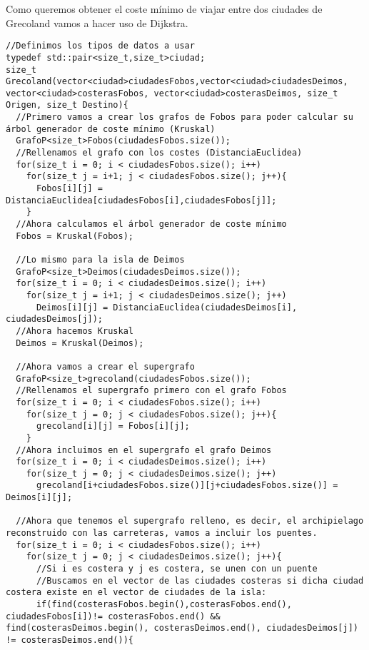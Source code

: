 Como queremos obtener el coste mínimo de viajar entre dos ciudades de Grecoland vamos a hacer uso de Dijkstra.
\begin{verbatim}
//Definimos los tipos de datos a usar
typedef std::pair<size_t,size_t>ciudad;
size_t Grecoland(vector<ciudad>ciudadesFobos,vector<ciudad>ciudadesDeimos, vector<ciudad>costerasFobos, vector<ciudad>costerasDeimos, size_t Origen, size_t Destino){
  //Primero vamos a crear los grafos de Fobos para poder calcular su árbol generador de coste mínimo (Kruskal)
  GrafoP<size_t>Fobos(ciudadesFobos.size());
  //Rellenamos el grafo con los costes (DistanciaEuclidea)
  for(size_t i = 0; i < ciudadesFobos.size(); i++)
    for(size_t j = i+1; j < ciudadesFobos.size(); j++){
      Fobos[i][j] = DistanciaEuclidea[ciudadesFobos[i],ciudadesFobos[j]];
    }
  //Ahora calculamos el árbol generador de coste mínimo
  Fobos = Kruskal(Fobos);

  //Lo mismo para la isla de Deimos
  GrafoP<size_t>Deimos(ciudadesDeimos.size());
  for(size_t i = 0; i < ciudadesDeimos.size(); i++)
    for(size_t j = i+1; j < ciudadesDeimos.size(); j++)
      Deimos[i][j] = DistanciaEuclidea(ciudadesDeimos[i], ciudadesDeimos[j]);
  //Ahora hacemos Kruskal
  Deimos = Kruskal(Deimos);

  //Ahora vamos a crear el supergrafo
  GrafoP<size_t>grecoland(ciudadesFobos.size());
  //Rellenamos el supergrafo primero con el grafo Fobos
  for(size_t i = 0; i < ciudadesFobos.size(); i++)
    for(size_t j = 0; j < ciudadesFobos.size(); j++){
      grecoland[i][j] = Fobos[i][j];
    }
  //Ahora incluimos en el supergrafo el grafo Deimos
  for(size_t i = 0; i < ciudadesDeimos.size(); i++)
    for(size_t j = 0; j < ciudadesDeimos.size(); j++)
      grecoland[i+ciudadesFobos.size()][j+ciudadesFobos.size()] = Deimos[i][j];
  
  //Ahora que tenemos el supergrafo relleno, es decir, el archipielago reconstruido con las carreteras, vamos a incluir los puentes.
  for(size_t i = 0; i < ciudadesFobos.size(); i++)
    for(size_t j = 0; j < ciudadesDeimos.size(); j++){
      //Si i es costera y j es costera, se unen con un puente
      //Buscamos en el vector de las ciudades costeras si dicha ciudad costera existe en el vector de ciudades de la isla:
      if(find(costerasFobos.begin(),costerasFobos.end(), ciudadesFobos[i])!= costerasFobos.end() &&                                                                                                   find(costerasDeimos.begin(), costerasDeimos.end(), ciudadesDeimos[j]) != costerasDeimos.end()){


\end{verbatim}
